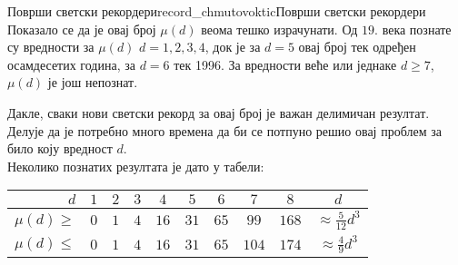 \begin{surferIntroPage}{Површи светски рекордери}{record_chmutovoktic}{Површи светски рекордери}
 Показало се да је овај број $\mu(d)$ веома тешко израчунати.
    Од $19$. века познате су вредности за $\mu(d)$  $d=1,2,3,4$, док је за  $d=5$
    овај број тек одређен осамдесетих година, за $d=6$ тек 1996.
    За вредности веће или једнаке $d\ge 7$, $\mu(d)$ је још непознат.
  
    Дакле, сваки нови светски рекорд за овај број је важан делимичан резултат. 
	Делује да је потребно много времена да би се потпуно решио овај проблем за било 
	коју вредност  $d$.\\  
	Неколико познатих резултата је дато у табели:
   \begin{center}
      \begin{tabular}{r|cccccccc|c}
        $d$ & $1$ & $2$ & $3$ & $4$ & $5$ & $6$ & $7$ & $8$ & $d$\\
        \hline
        \hline
        \rule{0pt}{1.2em}$\mu(d)\ge$ & $0$ & $1$ & $4$ & $16$ & $31$ & $65$ &
        $99$ & $168$ & 
        $\approx \frac{5}{12}d^3$\\[0.3em]
        \hline
        \rule{0pt}{1.2em}$\mu(d)\le$ & $0$ & $1$ & $4$ & $16$ & $31$ & $65$ &
        $104$ & $174$ & $\approx \frac{4}{9}d^3$
      \end{tabular}
    \end{center}
\end{surferIntroPage}
